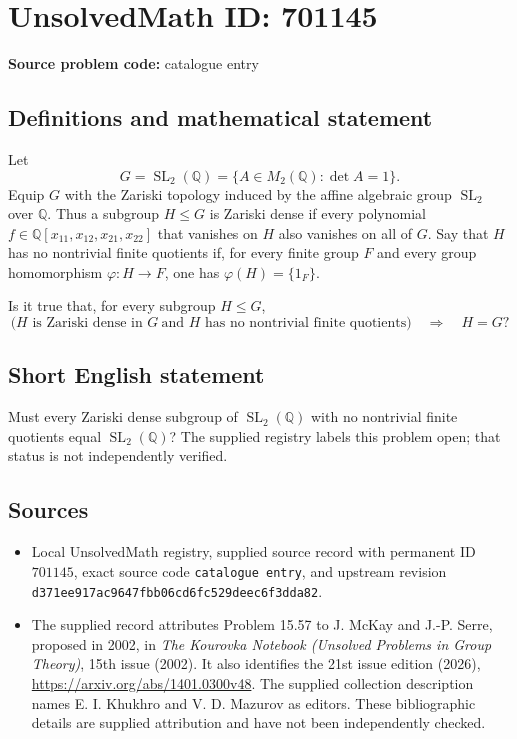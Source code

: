 \documentclass[11pt]{article}
\newcommand{\Q}{\mathbb{Q}}
\begin{document}
\section*{UnsolvedMath ID: 701145}
\textbf{Source problem code:} catalogue entry
\subsection{Definitions and mathematical statement}
Let
\[
G=\operatorname{SL}_2(\Q)=\{A\in M_2(\Q):\det A=1\}.
\]
Equip \(G\) with the Zariski topology induced by the affine algebraic group \(\operatorname{SL}_2\) over \(\Q\). Thus a subgroup \(H\leq G\) is Zariski dense if every polynomial \(f\in\Q[x_{11},x_{12},x_{21},x_{22}]\) that vanishes on \(H\) also vanishes on all of \(G\). Say that \(H\) has no nontrivial finite quotients if, for every finite group \(F\) and every group homomorphism \(\varphi:H\to F\), one has \(\varphi(H)=\{1_F\}\).

Is it true that, for every subgroup \(H\leq G\),
\[
\bigl(H\text{ is Zariski dense in }G\ \text{and }H\text{ has no nontrivial finite quotients}\bigr)
\quad\Longrightarrow\quad H=G?
\]
\subsection{Short English statement}
Must every Zariski dense subgroup of \(\operatorname{SL}_2(\Q)\) with no nontrivial finite quotients equal \(\operatorname{SL}_2(\Q)\)? The supplied registry labels this problem open; that status is not independently verified.
\subsection{Sources}
\begin{itemize}
\item Local UnsolvedMath registry, supplied source record with permanent ID \(701145\), exact source code \texttt{catalogue entry}, and upstream revision \texttt{d371ee917ac9647fbb06cd6fc529deec6f3dda82}.
\item The supplied record attributes Problem 15.57 to J. McKay and J.-P. Serre, proposed in 2002, in \emph{The Kourovka Notebook (Unsolved Problems in Group Theory)}, 15th issue (2002). It also identifies the 21st issue edition (2026), \url{https://arxiv.org/abs/1401.0300v48}. The supplied collection description names E. I. Khukhro and V. D. Mazurov as editors. These bibliographic details are supplied attribution and have not been independently checked.
\end{itemize}
\end{document}
